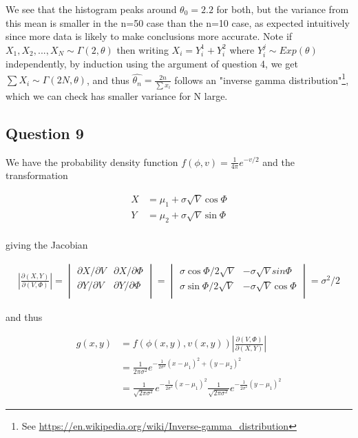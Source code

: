 \documentclass[10pt,a4paper]{report}
\begin{document}
We see that the histogram peaks around $\theta_0=2.2$ for both, but the variance from this mean is smaller in the n=50 case than the n=10 case, as expected intuitively since more data is likely to make conclusions more accurate. Note if $X_1,X_2,...,X_N \sim \Gamma(2,\theta)$ then writing $X_i=Y_i^1+Y_i^2$ where $Y_i^j\sim Exp(\theta)$ independently, by induction using the argument of question 4, we get $\sum X_i \sim \Gamma(2N,\theta)$, and thus $\hat{\theta_n}=\frac{2n}{\sum{x_i}}$ follows an "inverse gamma distribution"\footnote{See \url{https://en.wikipedia.org/wiki/Inverse-gamma_distribution}}, which we can check has smaller variance for N large.



\subsection*{Question 9}
We have the probability density function $f(\phi,v)=\frac{1}{4\pi}e^{-v/2}$ and the transformation 

\begin{align*}
X &= \mu_1 +\sigma\sqrt{V}\cos\Phi\\
Y &= \mu_2 +\sigma\sqrt{V}\sin\Phi\\
\end{align*}

giving the Jacobian 

\begin{align*}
\left|\frac{\partial(X,Y)}{
\partial(V,\Phi)}\right|
=
\begin{vmatrix}
\partial X/\partial V & \partial X/\partial \Phi\\
\partial Y/\partial V & \partial Y/\partial \Phi\\
\end{vmatrix}
=
\begin{vmatrix}
 \sigma\cos\Phi/2\sqrt{V} & -\sigma\sqrt{V}sin\Phi\\
 \sigma\sin\Phi/2\sqrt{V} & -\sigma\sqrt{V}\cos\Phi\\
\end{vmatrix}
=\sigma^2/2
\end{align*}

and thus 

\begin{align*}
g(x,y)&=f(\phi(x,y),v(x,y))\left|\frac{\partial(V,\Phi)}{
\partial(X,Y)}\right|\\
&=\frac{1}{2\pi\sigma^2}e^{-\frac{1}{2\sigma^2}(x-\mu_1)^2+(y-\mu_2)^2}\\
&=\frac{1}{\sqrt{2\pi\sigma^2}}e^{-\frac{1}{2\sigma^2}(x-\mu_1)^2}\frac{1}{\sqrt{2\pi\sigma^2}}e^{-\frac{1}{2\sigma^2}(y-\mu_1)^2}
\end{align*}
\end{document}
